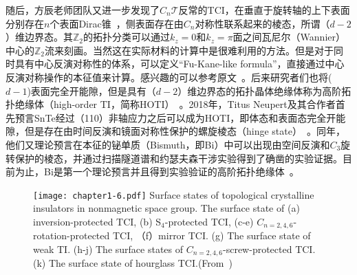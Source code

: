 随后，方辰老师团队又进一步发现了$C_n\mathcal{T}$反常的TCI，在垂直于旋转轴的上下表面分别存在$n$个表面Dirac锥~\citep{songzd2017,Fangc2t}，侧表面存在由$C_n$对称性联系起来的棱态，所谓（$d-2$）维边界态。其$\mathbb{Z}_2$的拓扑分类可以通过$k_z=0$和$k_z=\pi$面之间瓦尼尔（Wannier）中心的$\mathbb{Z}_2$流来刻画。当然这在实际材料的计算中是很难利用的方法。但是对于同时具有中心反演对称性的体系，可以定义“Fu-Kane-like formula”，直接通过中心反演对称操作的本征值来计算。感兴趣的可以参考原文~\citep{songzd2017,Fangc2t}。后来研究者们也将($d-1$)表面完全开能隙，但是具有（$d-2$）维边界态的拓扑晶体绝缘体称为高阶拓扑绝缘体（high-order TI，简称HOTI）~\citep{bernevig17,Schindler,Schindler2018}。2018年，Titus Neupert及其合作者首先预言SnTe经过（110）非轴应力之后可以成为HOTI，即体态和表面态完全开能隙，但是存在由时间反演和镜面对称性保护的螺旋棱态（hinge state）~\citep{Schindler}。同年，他们又理论预言在本征的铋单质（Bismuth，即Bi）中可以出现由空间反演和$C_3$旋转保护的棱态，并通过扫描隧道谱和约瑟夫森干涉实验得到了确凿的实验证据。目前为止，Bi是第一个理论预言并且得到实验验证的高阶拓扑绝缘体~\citep{Schindler2018}。

\begin{figure}[!t]
    \centering
    \texttt{[image: chapter1-6.pdf]}
    { Surface states of topological crystalline insulators in nonmagnetic space group. The surface state of (a) inversion-protected TCI, (b) S$_4$-protected TCI, (c-e) $C_{n=2,4,6}$-rotation-protected TCI, （f）mirror TCI. (g) The surface state of weak TI. (h-j) The surface states of $C_{n=2,4,6}$-screw-protected TCI. (k) The surface state of hourglass TCI.(From~\citep{Song2019})}
    \label{fig:1-6}
\end{figure}

